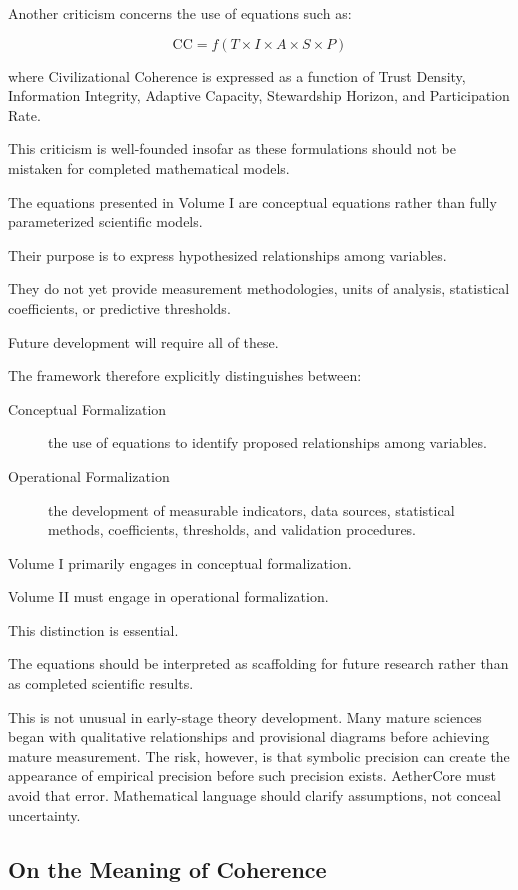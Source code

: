\documentclass[12pt]{article}
\begin{document}
Another criticism concerns the use of equations such as:

\[
\mathrm{CC}=f(T \times I \times A \times S \times P)
\]

where Civilizational Coherence is expressed as a function of Trust Density, Information Integrity, Adaptive Capacity, Stewardship Horizon, and Participation Rate.

This criticism is well-founded insofar as these formulations should not be mistaken for completed mathematical models.

The equations presented in Volume I are conceptual equations rather than fully parameterized scientific models.

Their purpose is to express hypothesized relationships among variables.

They do not yet provide measurement methodologies, units of analysis, statistical coefficients, or predictive thresholds.

Future development will require all of these.

The framework therefore explicitly distinguishes between:

\begin{description}
  \item[Conceptual Formalization] the use of equations to identify proposed relationships among variables.
  \item[Operational Formalization] the development of measurable indicators, data sources, statistical methods, coefficients, thresholds, and validation procedures.
\end{description}

Volume I primarily engages in conceptual formalization.

Volume II must engage in operational formalization.

This distinction is essential.

The equations should be interpreted as scaffolding for future research rather than as completed scientific results.

This is not unusual in early-stage theory development. Many mature sciences began with qualitative relationships and provisional diagrams before achieving mature measurement. The risk, however, is that symbolic precision can create the appearance of empirical precision before such precision exists. AetherCore must avoid that error. Mathematical language should clarify assumptions, not conceal uncertainty.

\subsection{On the Meaning of Coherence}
\end{document}
